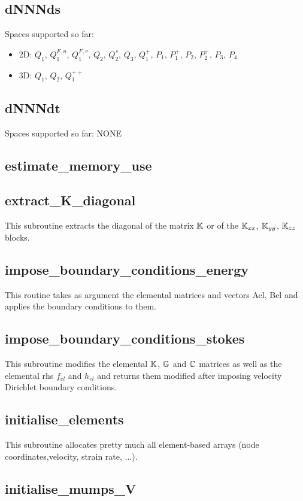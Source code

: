  \subsection{dNNNds}
 Spaces supported so far:
 \begin{itemize}
 \item 2D: $Q_1$, $Q_1^{F,u}$, $Q_1^{F,v}$, $Q_2$, $Q_2^s$, $Q_3$, $Q_1^+$, 
 $P_1$, $P_1^+$, $P_2$, $P_2^+$, $P_3$, $P_4$
 \item 3D: $Q_1$, $Q_2$, $Q_1^{++}$
 \end{itemize}
 \subsection{dNNNdt}
 Spaces supported so far: NONE
 \subsection{estimate\_memory\_use}

 \subsection{extract\_K\_diagonal}
 This subroutine extracts the diagonal of the matrix ${\mathbb{K}}$ or 
 of the ${\mathbb{K}}_{xx}$, ${\mathbb{K}}_{yy}$, ${\mathbb{K}}_{zz}$ blocks.
 \subsection{impose\_boundary\_conditions\_energy}
 This routine takes as argument the elemental matrices and vectors Ael, Bel
 and applies the boundary conditions to them.
 \subsection{impose\_boundary\_conditions\_stokes}
 This subroutine modifies the elemental ${\mathbb{K}}$, ${\mathbb{G}}$ and ${\mathbb{C}}$ matrices as well as the 
 elemental rhs $f_{el}$ and $h_{el}$ and returns them modified after imposing
 velocity Dirichlet boundary conditions.
 \subsection{initialise\_elements}
 This subroutine allocates pretty much all element-based arrays (node coordinates,velocity,
 strain rate, ...).
 \subsection{initialise\_mumps\_V}

